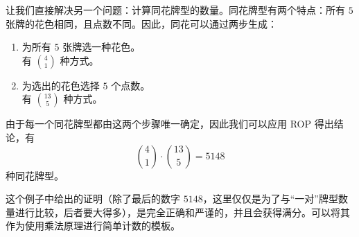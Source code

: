 \begin{example}[同花]

    让我们直接解决另一个问题：计算同花牌型的数量。同花牌型有两个特点：所有 $5$ 张牌的花色相同，且点数不同。因此，同花可以通过两步生成：
    \begin{enumerate}[label=(\arabic*)]
        \item 为所有 $5$ 张牌选一种花色。\\
              有 ${4 \choose 1}$ 种方式。
        \item 为选出的花色选择 $5$ 个点数。\\
              有 ${13 \choose 5}$ 种方式。
    \end{enumerate}
    由于每一个同花牌型都由这两个步骤唯一确定，因此我们可以应用 ROP 得出结论，有
    \[{4 \choose 1} \cdot {13 \choose 5}=5148\]
    种同花牌型。

    这个例子中给出的证明（除了最后的数字 $5148$，这里仅仅是为了与``一对''牌型数量进行比较，后者要大得多），是完全正确和严谨的，并且会获得满分。可以将其作为使用乘法原理进行简单计数的模板。
\end{example}

